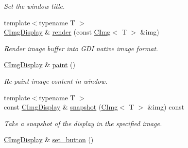 \begin{DoxyCompactItemize}
\begin{DoxyCompactList}\small\item\em Set the window title. \item\end{DoxyCompactList}\item 
\hypertarget{structcimg__library_1_1CImgDisplay_a1e0eea237d50ddb7e010a8b5edb5fdf4}{
{\footnotesize template$<$typename T $>$ }\\\hyperlink{structcimg__library_1_1CImgDisplay}{CImgDisplay} \& \hyperlink{structcimg__library_1_1CImgDisplay_a1e0eea237d50ddb7e010a8b5edb5fdf4}{render} (const \hyperlink{structcimg__library_1_1CImg}{CImg}$<$ T $>$ \&img)}
\label{structcimg__library_1_1CImgDisplay_a1e0eea237d50ddb7e010a8b5edb5fdf4}

\begin{DoxyCompactList}\small\item\em Render image buffer into GDI native image format. \item\end{DoxyCompactList}\item 
\hypertarget{structcimg__library_1_1CImgDisplay_a4e67d156351dd7dfdfd2f04e563c4f2a}{
\hyperlink{structcimg__library_1_1CImgDisplay}{CImgDisplay} \& \hyperlink{structcimg__library_1_1CImgDisplay_a4e67d156351dd7dfdfd2f04e563c4f2a}{paint} ()}
\label{structcimg__library_1_1CImgDisplay_a4e67d156351dd7dfdfd2f04e563c4f2a}

\begin{DoxyCompactList}\small\item\em Re-\/paint image content in window. \item\end{DoxyCompactList}\item 
\hypertarget{structcimg__library_1_1CImgDisplay_a4b97d4d8b8c293cbf540ba06596ded54}{
{\footnotesize template$<$typename T $>$ }\\const \hyperlink{structcimg__library_1_1CImgDisplay}{CImgDisplay} \& \hyperlink{structcimg__library_1_1CImgDisplay_a4b97d4d8b8c293cbf540ba06596ded54}{snapshot} (\hyperlink{structcimg__library_1_1CImg}{CImg}$<$ T $>$ \&img) const }
\label{structcimg__library_1_1CImgDisplay_a4b97d4d8b8c293cbf540ba06596ded54}

\begin{DoxyCompactList}\small\item\em Take a snapshot of the display in the specified image. \item\end{DoxyCompactList}\item 
\hypertarget{structcimg__library_1_1CImgDisplay_a6e9eb0990daa50aa51ce6202bcf774ae}{
\hyperlink{structcimg__library_1_1CImgDisplay}{CImgDisplay} \& \hyperlink{structcimg__library_1_1CImgDisplay_a6e9eb0990daa50aa51ce6202bcf774ae}{set\_\-button} ()}
\label{structcimg__library_1_1CImgDisplay_a6e9eb0990daa50aa51ce6202bcf774ae}


\end{DoxyCompactItemize}
